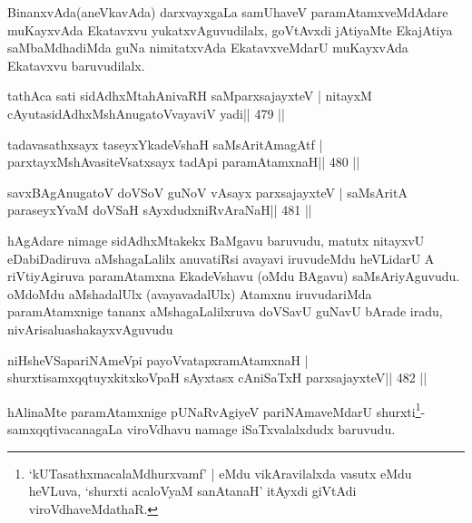 \begin{artha}
BinanxvAda(aneVkavAda) darxvayxgaLa samUhaveV paramAtamxveMdAdare muKayxvAda Ekatavxvu yukatxvAguvudilalx, goVtAvxdi jAtiyaMte EkajAtiya saMbaMdhadiMda guNa nimitatxvAda EkatavxveMdarU muKayxvAda Ekatavxvu baruvudilalx.
\end{artha}



\begin{shl}
tathAca sati sidAdhxMtahAnivaRH saMparxsajayxteV |
nitayxM cAyutasidAdhxMshAnugatoV\s vayaviV yadi\hfill || 479 ||
\end{shl}

\begin{shl}
tadavasathxsayx taseyxYkadeVshaH saMsAritAmagAtf |
parxtayxMshAvasiteVsatxsayx tadA\s pi paramAtamxnaH\hfill || 480 ||
\end{shl}

\begin{shl}
savxBAgAnugatoV doVSoV guNoV vA\s sayx parxsajayxteV |
saMsAritA paraseyxYvaM doVSaH sAyxdudxniRvAraNaH\hfill || 481 ||
\end{shl}

\begin{artha}
hAgAdare nimage sidAdhxMtakekx BaMgavu baruvudu, matutx nitayxvU
eDabiDadiruva aMshagaLalilx anuvatiRsi avayavi iruvudeMdu heVLidarU A
riVtiyAgiruva paramAtamxna EkadeVshavu (oMdu BAgavu) saMsAriyAguvudu.
oMdoMdu aMshadalUlx (avayavadalUlx) Atamxnu iruvudariMda
paramAtamxnige tananx aMshagaLalilxruva doVSavU guNavU bArade iradu,
nivArisalu\break ashakayxvAguvudu
\end{artha}


\begin{shl}
niHsheVSapariNAmeV\s pi payoVvatapxramAtamxnaH |
shurxtisamxqqtuyxkitxkoVpaH sAyxtasx cAniSaTxH parxsajayxteV\hfill || 482 ||
\end{shl}

\begin{artha}
hAlinaMte paramAtamxnige pUNaRvAgiyeV pariNAmaveMdarU shurxti\footnote{`kUTasathxmacalaMdhurxvamf' | eMdu vikAravilalxda vasutx eMdu heVLuva, `shurxti acaloV\s yaM sanAtanaH' itAyxdi giVtAdi viroVdhaveMdathaR.}- samxqqtivacanagaLa viroVdhavu namage iSaTxvalalxdudx baruvudu.
\end{artha}



